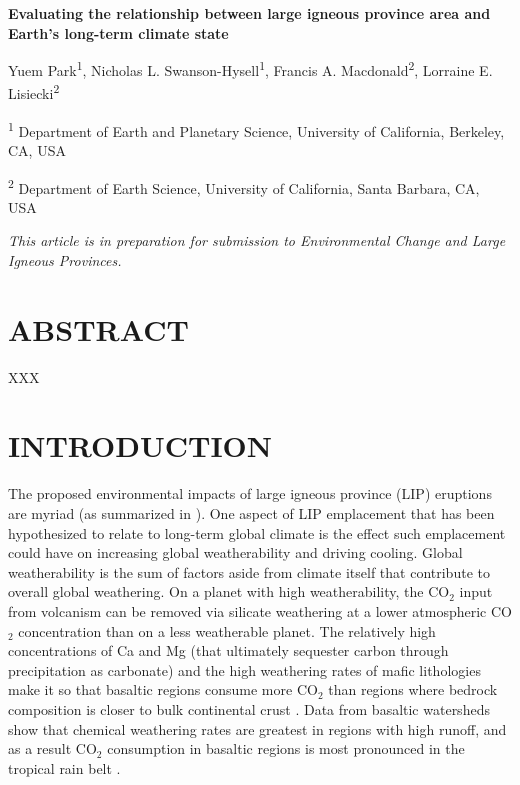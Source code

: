 \documentclass[11pt,letterpaper]{article}
\begin{document}
\begin{flushleft}
{\Large \textbf{Evaluating the relationship between large igneous province area and Earth's long-term climate state}}

Yuem Park\textsuperscript{1},
Nicholas L. Swanson-Hysell\textsuperscript{1},
Francis A. Macdonald\textsuperscript{2},
Lorraine E. Lisiecki\textsuperscript{2}

\bigskip
\textsuperscript{1} Department of Earth and Planetary Science, University of California, Berkeley, CA, USA

\textsuperscript{2} Department of Earth Science, University of California, Santa Barbara, CA, USA
\bigskip

\end{flushleft}

\noindent\textit{This article is in preparation for submission to \textit{Environmental Change and Large Igneous Provinces}.}

\linenumbers

\section*{ABSTRACT \label{sec:ABSTRACT}}

XXX

\section*{INTRODUCTION \label{sec:INTRODUCTION}}

The proposed environmental impacts of large igneous province (LIP) eruptions are myriad (as summarized in \citealp{Ernst2017a}). One aspect of LIP emplacement that has been hypothesized to relate to long-term global climate is the effect such emplacement could have on increasing global weatherability and driving cooling. Global weatherability is the sum of factors aside from climate itself that contribute to overall global weathering. On a planet with high weatherability, the CO$_2$ input from volcanism can be removed via silicate weathering at a lower atmospheric CO$_2$ concentration than on a less weatherable planet. The relatively high concentrations of Ca and Mg (that ultimately sequester carbon through precipitation as carbonate) and the high weathering rates of mafic lithologies make it so that basaltic regions consume more CO$_2$ than regions where bedrock composition is closer to bulk continental crust \citep{Dessert2003a}. Data from basaltic watersheds show that chemical weathering rates are greatest in regions with high runoff, and as a result CO$_2$ consumption in basaltic regions is most pronounced in the tropical rain belt \citep{Dessert2003a, Hartmann2014a}.
\end{document}
